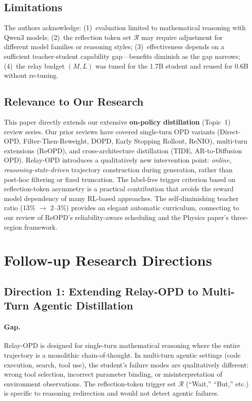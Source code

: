 \documentclass[11pt,a4paper]{article}
\begin{document}
\subsection{Limitations}

The authors acknowledge: (1)~evaluation limited to mathematical reasoning with Qwen3 models; (2)~the reflection token set $\mathcal{R}$ may require adjustment for different model families or reasoning styles; (3)~effectiveness depends on a sufficient teacher-student capability gap---benefits diminish as the gap narrows; (4)~the relay budget $(M,L)$ was tuned for the 1.7B student and reused for 0.6B without re-tuning.

\subsection{Relevance to Our Research}

This paper directly extends our extensive \textbf{on-policy distillation} (Topic~1) review series. Our prior reviews have covered single-turn OPD variants (Direct-OPD, Filter-Then-Reweight, DOPD, Early Stopping Rollout, ReNIO), multi-turn extensions (ReOPD), and cross-architecture distillation (TIDE, AR-to-Diffusion OPD). Relay-OPD introduces a qualitatively new intervention point: \emph{online, reasoning-state-driven} trajectory construction during generation, rather than post-hoc filtering or fixed truncation. The label-free trigger criterion based on reflection-token asymmetry is a practical contribution that avoids the reward model dependency of many RL-based approaches. The self-diminishing teacher ratio (13\% $\to$ 2--3\%) provides an elegant automatic curriculum, connecting to our review of ReOPD's reliability-aware scheduling and the Physics paper's three-region framework.

\section{Follow-up Research Directions}

\subsection{Direction 1: Extending Relay-OPD to Multi-Turn Agentic Distillation}

\paragraph{Gap.}
Relay-OPD is designed for single-turn mathematical reasoning where the entire trajectory is a monolithic chain-of-thought. In multi-turn agentic settings (code execution, search, tool use), the student's failure modes are qualitatively different: wrong tool selection, incorrect parameter binding, or misinterpretation of environment observations. The reflection-token trigger set $\mathcal{R}$ (``Wait,'' ``But,'' etc.) is specific to reasoning redirection and would not detect agentic failures.
\end{document}
